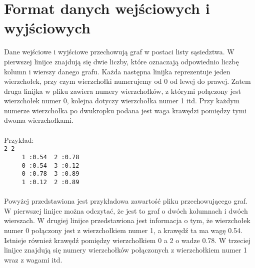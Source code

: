 \documentclass[11pt,a4paper]{report}
\begin{document}
    \newpage
    \section{Format danych wejściowych i wyjściowych}
    Dane wejściowe i wyjściowe przechowują graf w postaci listy sąsiedztwa. W pierwszej linijce znajdują się dwie liczby, które oznaczają odpowiednio liczbę kolumn i wierszy danego grafu. Każda następna linijka reprezentuje jeden wierzchołek, przy czym wierzchołki numerujemy od 0 od lewej do prawej. Zatem druga linijka w pliku zawiera numery wierzchołków, z którymi połączony jest wierzchołek numer 0, kolejna dotyczy wierzchołka numer 1 itd. Przy każdym numerze wierzchołka po dwukropku podana jest waga krawędzi pomiędzy tymi dwoma wierzchołkami.\\
    \\
    Przykład:\\
    \verb|2 2|\\
    \verb|     1 :0.54  2 :0.78 |\\
    \verb|     0 :0.54  3 :0.12 |\\
    \verb|     0 :0.78  3 :0.89 |\\
    \verb|     1 :0.12  2 :0.89 |\\
    \\
    Powyżej przedstawiona jest przykładowa zawartość pliku przechowującego graf. W pierwszej linijce można odczytać, że jest to graf o dwóch kolumnach i dwóch wierszach. W drugiej linijce przedstawiona jest informacja o tym, że wierzchołek numer 0 połączony jest z wierzchołkiem numer 1, a krawędź ta ma wagę 0.54. Istnieje również krawędź pomiędzy wierzchołkiem 0 a 2 o wadze 0.78. W trzeciej linijce znajdują się numery wierzchołków połączonych z wierzchołkiem numer 1 wraz z wagami itd.

    \newpage
\end{document}
